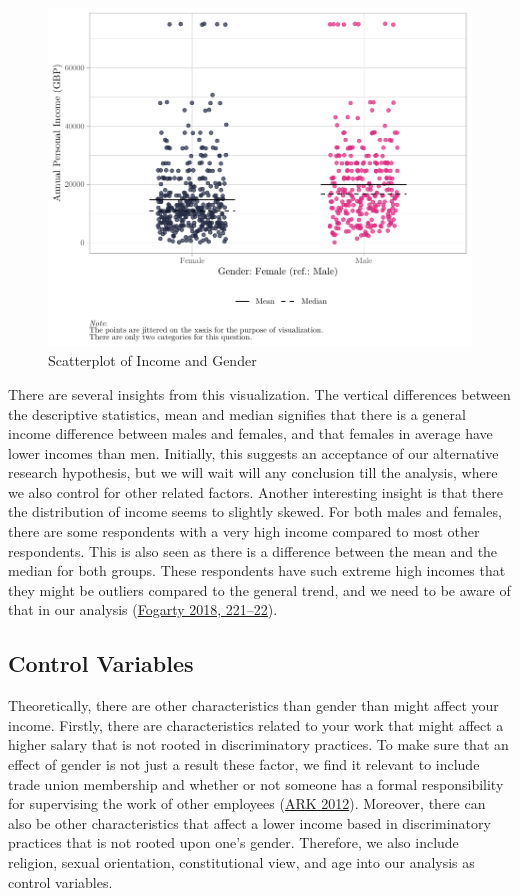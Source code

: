 \documentclass[
]{article}
\begin{document}
\begin{figure}[H]

{\centering \includegraphics[width=0.8\linewidth]{paper_files/figure-latex/unnamed-chunk-2-1} 

}

\caption{Scatterplot of Income and Gender}\label{fig:unnamed-chunk-2}
\end{figure}

There are several insights from this visualization. The vertical
differences between the descriptive statistics, mean and median
signifies that there is a general income difference between males and
females, and that females in average have lower incomes than men.
Initially, this suggests an acceptance of our alternative research
hypothesis, but we will wait will any conclusion till the analysis,
where we also control for other related factors. Another interesting
insight is that there the distribution of income seems to slightly
skewed. For both males and females, there are some respondents with a
very high income compared to most other respondents. This is also seen
as there is a difference between the mean and the median for both
groups. These respondents have such extreme high incomes that they might
be outliers compared to the general trend, and we need to be aware of
that in our analysis
(\protect\hyperlink{ref-fogarty2018quantitative}{Fogarty 2018,
221--22}).

\hypertarget{control-variables}{%
\subsection{Control Variables}\label{control-variables}}

Theoretically, there are other characteristics than gender than might
affect your income. Firstly, there are characteristics related to your
work that might affect a higher salary that is not rooted in
discriminatory practices. To make sure that an effect of gender is not
just a result these factor, we find it relevant to include trade union
membership and whether or not someone has a formal responsibility for
supervising the work of other employees
(\protect\hyperlink{ref-ark_2012}{ARK 2012}). Moreover, there can also
be other characteristics that affect a lower income based in
discriminatory practices that is not rooted upon one's gender.
Therefore, we also include religion, sexual orientation, constitutional
view, and age into our analysis as control variables.
\end{document}
